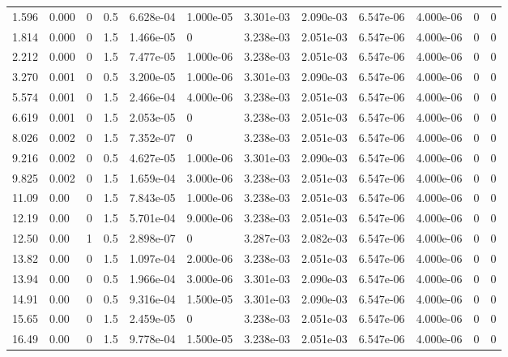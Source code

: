 \documentclass[preview]{standalone}
\begin{document}
{{\begin{tabular}{L{1.2cm}C{1.2cm} C{0.3cm}C{0.5cm} C{1.4cm}C{1.4cm} C{1.4cm}C{1.4cm} C{1.6cm}C{1.6cm} C{1.6cm}C{1.6cm}}
  1.596  &  0.000  & 0     & 0.5 &  6.628e-04  & 1.000e-05  &  3.301e-03&   2.090e-03& 6.547e-06 & 4.000e-06   &  0 & 0  \\ 
  1.814  &  0.000  & 0     & 1.5 &  1.466e-05  & 0  &  3.238e-03&   2.051e-03& 6.547e-06 & 4.000e-06   &  0 & 0  \\ 
  2.212  &  0.000  & 0     & 1.5 &  7.477e-05  & 1.000e-06  &  3.238e-03&   2.051e-03& 6.547e-06 & 4.000e-06   &  0 & 0  \\ 
  3.270  &  0.001  & 0     & 0.5 &  3.200e-05  & 1.000e-06  &  3.301e-03&   2.090e-03& 6.547e-06 & 4.000e-06   &  0 & 0  \\ 
  5.574  &  0.001  & 0     & 1.5 &  2.466e-04  & 4.000e-06  &  3.238e-03&   2.051e-03& 6.547e-06 & 4.000e-06   &  0 & 0  \\ 
  6.619  &  0.001  & 0     & 1.5 &  2.053e-05  & 0  &  3.238e-03&   2.051e-03& 6.547e-06 & 4.000e-06   &  0 & 0  \\ 
  8.026  &  0.002  & 0     & 1.5 &  7.352e-07  & 0  &  3.238e-03&   2.051e-03& 6.547e-06 & 4.000e-06   &  0 & 0  \\ 
  9.216  &  0.002  & 0     & 0.5 &  4.627e-05  & 1.000e-06  &  3.301e-03&   2.090e-03& 6.547e-06 & 4.000e-06   &  0 & 0  \\ 
  9.825  &  0.002  & 0     & 1.5 &  1.659e-04  & 3.000e-06  &  3.238e-03&   2.051e-03& 6.547e-06 & 4.000e-06   &  0 & 0  \\ 
  11.09  &  0.00  & 0     & 1.5 &  7.843e-05  & 1.000e-06  &  3.238e-03&   2.051e-03& 6.547e-06 & 4.000e-06   &  0 & 0  \\ 
  12.19  &  0.00  & 0     & 1.5 &  5.701e-04  & 9.000e-06  &  3.238e-03&   2.051e-03& 6.547e-06 & 4.000e-06   &  0 & 0  \\ 
  12.50  &  0.00  & 1     & 0.5 &  2.898e-07  & 0  &  3.287e-03&   2.082e-03& 6.547e-06 & 4.000e-06   &  0 & 0  \\ 
  13.82  &  0.00  & 0     & 1.5 &  1.097e-04  & 2.000e-06  &  3.238e-03&   2.051e-03& 6.547e-06 & 4.000e-06   &  0 & 0  \\ 
  13.94  &  0.00  & 0     & 0.5 &  1.966e-04  & 3.000e-06  &  3.301e-03&   2.090e-03& 6.547e-06 & 4.000e-06   &  0 & 0  \\ 
  14.91  &  0.00  & 0     & 0.5 &  9.316e-04  & 1.500e-05  &  3.301e-03&   2.090e-03& 6.547e-06 & 4.000e-06   &  0 & 0  \\ 
  15.65  &  0.00  & 0     & 1.5 &  2.459e-05  & 0  &  3.238e-03&   2.051e-03& 6.547e-06 & 4.000e-06   &  0 & 0  \\ 
  16.49  &  0.00  & 0     & 1.5 &  9.778e-04  & 1.500e-05  &  3.238e-03&   2.051e-03& 6.547e-06 & 4.000e-06   &  0 & 0  \\ 

\end{tabular}}}
\end{document}
